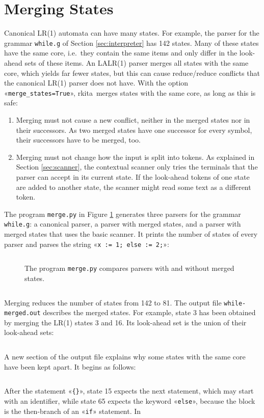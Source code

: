 \documentclass[11pt,a4paper]{article}
\makeatletter
\newcommand{\blue}[1]{{\color{blue}#1}}
\newcommand{\fakesc}[1]{\resizebox{!}{0.99ex}{\textls[90]{\MakeUppercase{#1}}}}
\def\@simtextsc#1#2\@nil{\MakeUppercase{#1}\fakesc{#2}}
\newcommand{\simtextsc}[1]{%
  \ifmmode\text{\@simtextsc#1\@nil}\else\@simtextsc#1\@nil\fi}
\newcommand{\Larkita}{\simtextsc{Larkita}}
\newenvironment{unbreakable}{\par\noindent\begin{minipage}{\linewidth}}{\end{minipage}\par}
\newcommand{\codefigure}[5][]{\begin{figure}[H]%
  \inputminted[numbers = left, numbersep = 0.3cm, #1]{#2}{examples/#3}%
  \vspace*{-0.3cm}%
  \caption{#5}\label{#4}\end{figure}}
\newcommand{\pythonfile}[2]{\codefigure{python3}{#1}{fig:#1}{#2}}
\newcommand{\resultfile}[2][\normalsize]{\begin{unbreakable}%
  \inputminted[fontsize = #1, breaklines]{text}{examples/output/#2.txt}\end{unbreakable}}
\makeatother
\begin{document}
\section{Merging States}
\label{sec:merging}
Canonical LR(1) automata can have many states.  For example, the parser for the grammar \texttt{while.g} of
Section \ref{sec:interpreter} has 142 states.  Many of these states have the same \blue{core}, i.e.~they contain the same items
and only differ in the look-ahead sets of these items.  An LALR(1) parser merges all states with the same core,
which yields far fewer states, but this can cause reduce/reduce conflicts that the canonical LR(1) parser does
not have.  With the option «\verb|merge_states=True|», \Larkita\ merges states with the same core, as long as
this is safe:
\begin{enumerate}
\item Merging must not cause a new conflict, neither in the merged states nor in their successors.  As two
      merged states have one successor for every symbol, their successors have to be merged, too.
\item Merging must not change how the input is split into tokens.  As explained in Section \ref{sec:scanner}, the
      contextual scanner only tries the terminals that the parser can accept in its current state.  If the
      look-ahead tokens of one state are added to another state, the scanner might read some text as a
      different token.
\end{enumerate}
The program \texttt{merge.py} in Figure \ref{fig:merge.py} generates three parsers for the grammar
\texttt{while.g}: a canonical parser, a parser with merged states, and a parser with merged states that uses
the basic scanner.  It prints the number of states of every parser and parses the string
«\verb|x := 1; else := 2;|»:
\pythonfile{merge.py}{The program \texttt{merge.py} compares parsers with and without merged states.}
\resultfile{merge}
Merging reduces the number of states from 142 to 81.  The output file \texttt{while-merged.out} describes
the merged states.  For example, state 3 has been obtained by merging the LR(1) states 3 and 16.  Its
look-ahead set is the union of their look-ahead sets:
\resultfile[\small]{while-merged-state}
A new section of the output file explains why some states with the same core have been kept apart.  It begins
as follows:
\resultfile[\small]{while-merged}
After the statement «\verb|{}|», state 15 expects the next statement, which may start with an identifier, while
state 65 expects the keyword «\verb|else|», because the block is the then-branch of an «\verb|if|» statement.  In
\end{document}
